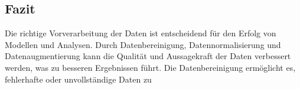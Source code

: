 \subsection{Fazit}

    Die richtige Vorverarbeitung der Daten ist entscheidend für den Erfolg von Modellen und Analysen. 
    Durch Datenbereinigung, Datennormalisierung und Datenaugmentierung kann die Qualität und Aussagekraft der Daten verbessert werden, was zu besseren Ergebnissen führt. 
    Die Datenbereinigung ermöglicht es, fehlerhafte oder unvollständige Daten zu